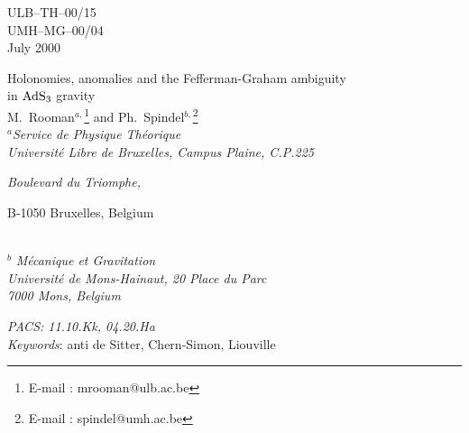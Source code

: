 \documentclass[a4paper,10pt]{article}
\begin{document}
 
 
\begin{flushright} ULB--TH--00/15 \\  UMH--MG--00/04 \\July 2000\\ \end{flushright} 
\vspace{.1cm} 
\begin{center} {\large Holonomies, anomalies 
and the Fefferman-Graham ambiguity\\  
\vspace{.1cm} in $\rm AdS_3$ gravity}\\ 
\vspace{.5cm} M.~Rooman${}^{a,}$\footnote{ 
E-mail : mrooman@ulb.ac.be} and Ph.~Spindel${}^{b,}$\footnote{ E-mail : 
spindel@umh.ac.be}\\ 
\vspace{.3cm}  {${}^a${\it Service de Physique Th\'eorique}}\\  
{\it Universit\'e 
Libre de Bruxelles, Campus Plaine, C.P.225}\\ {\it Boulevard du Triomphe, 

B-1050 Bruxelles, Belgium}\\  
\vspace{.2cm} {${}^b${\it 
M\'ecanique et Gravitation}}\\ {\it Universit\'e de Mons-Hainaut, 20 
Place du Parc}\\  
{\it 7000 Mons, Belgium}\\ \end{center} 
\vspace{.1cm} 
 
\newcommand{\asym}{\mathop {\simeq} \limits_{\bar r \rightarrow \infty}} 
\newcommand{\asymr}{\mathop {\simeq} \limits_{ r \rightarrow \infty}} 
\newcommand{\real}{{\hbox{{\rm I}\kern-.2em\hbox{\rm R}}}} 
 
\begin{abstract} 
Using the Chern-Simon formulation of (2+1) gravity,  
we derive, for the general asymptotic metrics given by the 
Fefferman-Graham-Lee theorems, the emergence of the Liouville mode  
associated to the boundary degrees of freedom of (2+1) dimensional  
anti de Sitter geometries. Holonomies are
described through multi-valued gauge and Liouville fields and
are found to algebraically couple the fields defined on
the disconnected components of spatial
infinity. In the case of flat boundary metrics, explicit 
expressions are obtained for the fields and holonomies.
We also show the link between the variation 
under diffeomorphisms of the Einstein theory of gravitation and 
the Weyl anomaly of the conformal theory at infinity.
\end{abstract}
\noindent
{\it PACS\/: 11.10.Kk, 04.20.Ha }\\
{\it Keywords}: anti de Sitter, Chern-Simon, Liouville
\end{document}

